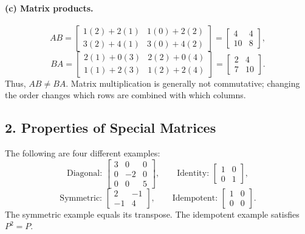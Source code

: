 \documentclass[11pt]{article}
\begin{document}
\paragraph{(c) Matrix products.}
\[
AB=
\begin{bmatrix}
1(2)+2(1)&1(0)+2(2)\\
3(2)+4(1)&3(0)+4(2)
\end{bmatrix}
=\boxed{\begin{bmatrix}4&4\\10&8\end{bmatrix}},
\]
\[
BA=
\begin{bmatrix}
2(1)+0(3)&2(2)+0(4)\\
1(1)+2(3)&1(2)+2(4)
\end{bmatrix}
=\boxed{\begin{bmatrix}2&4\\7&10\end{bmatrix}}.
\]
Thus, $AB\ne BA$. Matrix multiplication is generally not commutative; changing the order changes which rows are combined with which columns.

\subsection*{2. Properties of Special Matrices}
The following are four different examples:
\[
\text{Diagonal: }\begin{bmatrix}3&0&0\\0&-2&0\\0&0&5\end{bmatrix},\qquad
\text{Identity: }\begin{bmatrix}1&0\\0&1\end{bmatrix},
\]
\[
\text{Symmetric: }\begin{bmatrix}2&-1\\-1&4\end{bmatrix},\qquad
\text{Idempotent: }\begin{bmatrix}1&0\\0&0\end{bmatrix}.
\]
The symmetric example equals its transpose. The idempotent example satisfies $P^2=P$.
\end{document}
